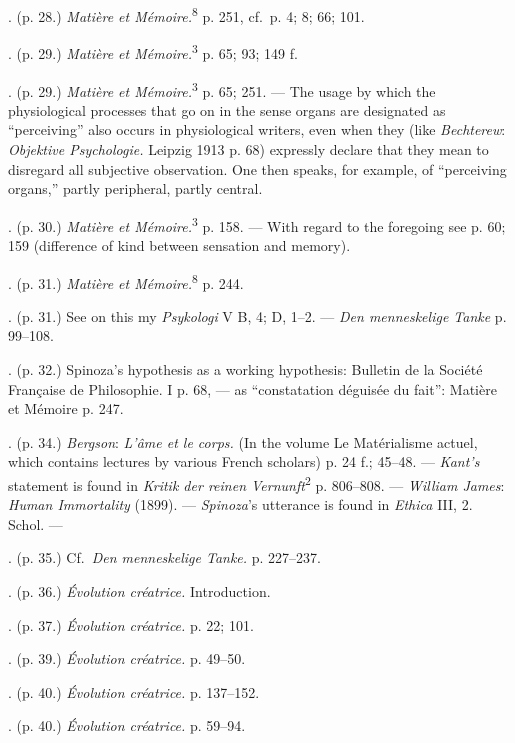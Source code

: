 \documentclass[12pt,a4paper,openany]{book}
\newcommand{\opage}[1]{\marginnote{\footnotesize\textit{[#1]}}}
\newcommand{\notelabel}[1]{\noindent #1}
\begin{document}
\begin{small}
\notelabel{20.} (p. 28.) \textit{Matière et Mémoire.}\textsuperscript{8} p. 251, cf.\ p. 4; 8; 66; 101.

\notelabel{21.} (p. 29.) \textit{Matière et Mémoire.}\textsuperscript{3} p. 65; 93; 149 f.

\notelabel{22.} (p. 29.) \textit{Matière et Mémoire.}\textsuperscript{3} p. 65; 251. --- The usage by which the physiological processes that go on in the sense organs are designated as ``perceiving'' also occurs in physiological writers, even when they (like \emph{Bechterew}: \textit{Objektive Psychologie.} Leipzig 1913 p. 68) expressly declare that they mean to disregard all subjective observation. One then speaks, for example, of ``perceiving organs,'' partly peripheral, partly central.

\notelabel{23.} (p. 30.) \textit{Matière et Mémoire.}\textsuperscript{3} p. 158. --- With regard to the foregoing see p. 60; 159 (difference of kind between sensation and memory).

\notelabel{24.} (p. 31.) \textit{Matière et Mémoire.}\textsuperscript{8} p. 244.

\notelabel{25.} (p. 31.) See on this my \textit{Psykologi} V B, 4; D, 1--2. --- \textit{Den menneskelige Tanke} p. 99--108.

\notelabel{26.} (p. 32.) Spinoza's hypothesis as a working hypothesis: Bulletin de la Société Française de Philosophie. I p. 68, --- as ``constatation déguisée du fait'': Matière et Mémoire p. 247.

\notelabel{27.} (p. 34.) \emph{Bergson}: \textit{L'âme et le corps.} (In the volume Le Matérialisme actuel, which contains lectures by various French scholars) p. 24 f.; 45--48. --- \emph{Kant's} statement is found in \textit{Kritik der reinen Vernunft}\textsuperscript{2} p. 806--808. --- \emph{William James}: \textit{Human Immortality} (1899). --- \emph{Spinoza}'s utterance is found in \textit{Ethica} III, 2. Schol. ---

\notelabel{28.} (p. 35.) Cf.\ \textit{Den menneskelige Tanke.} p. 227--237.

\notelabel{29.} (p. 36.) \textit{Évolution créatrice.} Introduction.

\notelabel{30.} (p. 37.) \textit{Évolution créatrice.} p. 22; 101.

\notelabel{31.} (p. 39.) \textit{Évolution créatrice.} p. 49--50.

\notelabel{32.} (p. 40.) \textit{Évolution créatrice.} p. 137--152.

\opage{69}\notelabel{33.} (p. 40.) \textit{Évolution créatrice.} p. 59--94.


\end{small}
\end{document}
